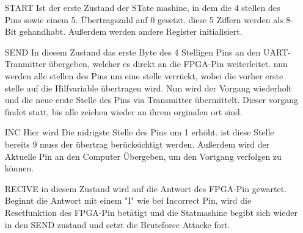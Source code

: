 \begin{itemize}


\item[START] Ist der erste Zustand der STate mashine, in dem die 4 stellen des Pins sowie einem 5. Übertragszahl auf 0 gesetzt. diese 5 Ziffern werden als 8-Bit gehandhabt. Außerdem werden andere Register initialisiert.

\item[SEND] In diesem Zustand das erste Byte des 4 Stelligen Pins an den UART-Tranmitter übergeben, welcher es direkt an die FPGA-Pin weiterleitet. nun werden alle stellen des Pins um eine stelle verrückt, wobei die vorher erste stelle auf die Hilfvariable übertragen wird. Nun wird der Vorgang wiederholt und die neue erste Stelle des Pins via Transmitter übermittelt. Dieser vorgang findet statt, bis alle zeichen wieder an ihrem orginalen ort sind. 

\item[INC] Hier wird Die nidrigste Stelle des Pins um 1 erhöht. ist diese Stelle bereits 9 muss der übertrag berücksichtigt werden. Außerdem wird der Aktuelle Pin an den Computer Übergeben, um den Vortgang verfolgen zu können.

\item[RECIVE] in diesem Zustand wird auf die Antwort des FPGA-Pin gewartet. Beginnt die Antwort mit einem "I" wie bei Incorrect Pin, wird die Resetfunktion des FPGA-Pin betätigt und die Statmashine begibt sich wieder in den SEND zustand und setzt die Bruteforce Attacke fort.

\end{itemize}


